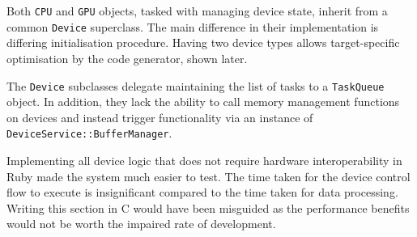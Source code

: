 Both \verb|CPU| and \verb|GPU| objects, tasked with managing device state, inherit from a common \verb|Device| superclass. The main difference in their implementation is differing initialisation procedure. Having two device types allows target-specific optimisation by the code generator, shown later.

The \verb|Device| subclasses delegate maintaining the list of tasks to a \verb|TaskQueue| object. In addition, they lack the ability to call memory management functions on devices and instead trigger functionality via an instance of \verb|DeviceService::BufferManager|.

Implementing all device logic that does not require hardware interoperability in Ruby made the system much easier to test. The time taken for the device control flow to execute is insignificant compared to the time taken for data processing. Writing this section in C would have been misguided as the performance benefits would not be worth the impaired rate of development.
